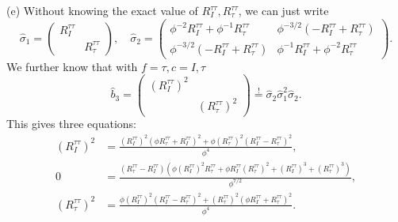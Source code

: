 \documentclass{book}
\begin{document}
(e) Without knowing the exact value of $R_{I}^{\tau \tau } ,R_{\tau }^{\tau \tau }$, we can just write
\begin{equation*}
\hat{\sigma }_{1} =\begin{pmatrix}
R_{I}^{\tau \tau } & \\
 & R_{\tau }^{\tau \tau }
\end{pmatrix} ,\quad \hat{\sigma }_{2} =\begin{pmatrix}
\phi ^{-2} R_{I}^{\tau \tau } +\phi ^{-1} R_{\tau }^{\tau \tau } & \phi ^{-3/2} (-R_{I}^{\tau \tau } +R_{\tau }^{\tau \tau } )\\
\phi ^{-3/2} (-R_{I}^{\tau \tau } +R_{\tau }^{\tau \tau } ) & \phi ^{-1} R_{I}^{\tau \tau } +\phi ^{-2} R_{\tau }^{\tau \tau }
\end{pmatrix} .
\end{equation*}
We further know that with $f=\tau ,c=I,\tau $
\begin{equation*}
\hat{b}_{3} =\begin{pmatrix}
(R_{I}^{\tau \tau } )^{2} & \\
 & (R_{\tau }^{\tau \tau } )^{2}
\end{pmatrix}\stackrel{!}{=}\hat{\sigma }_{2}\hat{\sigma }_{1}^{2}\hat{\sigma }_{2} .
\end{equation*}
This gives three equations:
\begin{equation*}
\begin{aligned}
(R_{I}^{\tau \tau } )^{2} & =\frac{(R_{I}^{\tau \tau } )^{2} (\phi R_{\tau }^{\tau \tau } +R_{I}^{\tau \tau } )^{2} +\phi (R_{\tau }^{\tau \tau } )^{2} (R_{I}^{\tau \tau } -R_{\tau }^{\tau \tau } )^{2}}{\phi ^{4}} ,\\
0 & =\frac{(R_{\tau }^{\tau \tau } -R_{I}^{\tau \tau } )(\phi (R_{I}^{\tau \tau } )^{2} R_{\tau }^{\tau \tau } +\phi R_{I}^{\tau \tau } (R_{\tau }^{\tau \tau } )^{2} +(R_{I}^{\tau \tau } )^{3} +(R_{\tau }^{\tau \tau } )^{3} )}{\phi ^{7/2}} ,\\
(R_{\tau }^{\tau \tau } )^{2} & =\frac{\phi (R_{I}^{\tau \tau } )^{2} (R_{I}^{\tau \tau } -R_{\tau }^{\tau \tau } )^{2} +(R_{\tau }^{\tau \tau } )^{2} (\phi R_{I}^{\tau \tau } +R_{\tau }^{\tau \tau } )^{2}}{\phi ^{4}} .
\end{aligned}
\end{equation*}
\end{document}
